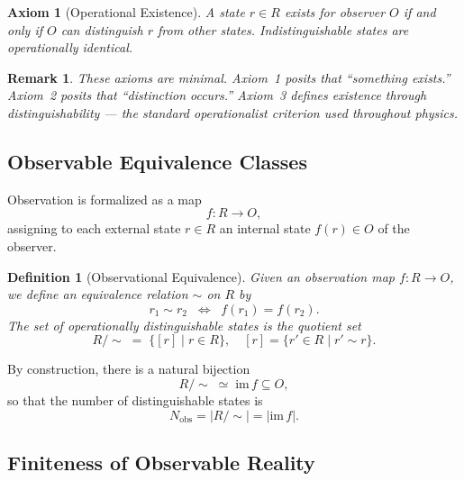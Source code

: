 \documentclass[12pt, a4paper]{article}
\newtheorem{definition}{Definition}
\newtheorem{remark}{Remark}
\newtheorem{axiom}{Axiom}
\begin{document}
\begin{axiom}[Operational Existence]
A state $r \in R$ exists for observer $O$ if and only if $O$ can distinguish $r$ from other states. Indistinguishable states are operationally identical.
\end{axiom}

\begin{remark}
These axioms are minimal. Axiom~1 posits that ``something exists.'' Axiom~2 posits that ``distinction occurs.'' Axiom~3 defines existence through distinguishability --- the standard operationalist criterion used throughout physics.
\end{remark}

\subsection{Observable Equivalence Classes}

Observation is formalized as a map
\begin{equation}
    f: R \to O,
\end{equation}
assigning to each external state $r \in R$ an internal state $f(r) \in O$ of the observer.

\begin{definition}[Observational Equivalence]
Given an observation map $f: R \to O$, we define an equivalence relation $\sim$ on $R$ by
\begin{equation}
    r_1 \sim r_2 \;\;\Longleftrightarrow\;\; f(r_1) = f(r_2).
\end{equation}
The set of \emph{operationally distinguishable} states is the quotient set
\begin{equation}
    R/\!\sim \;=\; \{[r] \mid r \in R\}, \quad [r] = \{ r' \in R \mid r' \sim r \}.
\end{equation}
\end{definition}

By construction, there is a natural bijection
\begin{equation}
    R/\!\sim \;\simeq\; \mathrm{im}\,f \subseteq O,
\end{equation}
so that the number of distinguishable states is
\begin{equation}
    N_{\text{obs}} = |R/\!\sim| = |\mathrm{im}\,f|.
\end{equation}

\subsection{Finiteness of Observable Reality}
\end{document}
